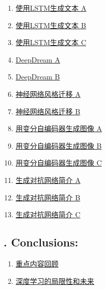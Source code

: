 \documentclass[11pt]{article}
\begin{document}
\begin{multicols}{2}
	\begin{enumerate}
		\item \href{https://mp.weixin.qq.com/s/PCwTsDdVVftTEWIDFxznFw}{使用LSTM生成文本 A}	%
		\item \href{https://mp.weixin.qq.com/s/6UILV9UGnSjaLiiz84laDA}{使用LSTM生成文本 B}	%
		\item \href{https://mp.weixin.qq.com/s/Cso1I8Njc4ifTsqwQ4UUCw}{使用LSTM生成文本 C}	%
		\item \href{https://mp.weixin.qq.com/s/riA-aYzBdUEE-K6VSOmt6Q}{DeepDream A}	%
		\item \href{https://mp.weixin.qq.com/s/cWqf3fHK3oQtgvj3CUb-FQ}{DeepDream B}	%
		\item \href{https://mp.weixin.qq.com/s/TxxqhPaGH4whobWxXkT5hg}{神经网络风格迁移 A}	%
		\item \href{https://mp.weixin.qq.com/s/MpBgzsyp5PrVCy3s_E5iqA}{神经网络风格迁移 B}	%
		\item \href{https://mp.weixin.qq.com/s/5VPZx2ncWuQWNS4istq9mw}{用变分自编码器生成图像 A}	%
		\item \href{https://mp.weixin.qq.com/s/F1L5FtnjwzKW65YvVVIAFw}{用变分自编码器生成图像 B}	%
		\item \href{https://mp.weixin.qq.com/s/7iLs7o0L8DBYAqYY6qswLA}{用变分自编码器生成图像 C}	%
		\item \href{https://mp.weixin.qq.com/s/tA38qtSJ4ZJ-kjOZugd5gg}{生成对抗网络简介 A}	%
		\item \href{https://mp.weixin.qq.com/s/c9J81SsufKd2FzgCgQ3Fog}{生成对抗网络简介 B}	%
		\item \href{https://mp.weixin.qq.com/s/zTSGydSPQ4CUvoc8JVVygg}{生成对抗网络简介 C}	%
	\end{enumerate}
\end{multicols}

\subsection*{\small {}. Conclusions:}

\vspace{-0.5cm}

\begin{multicols}{2}
	\begin{enumerate}
		\item \href{https://mp.weixin.qq.com/s/q0rSEn19fD8UkZIl_fNKXQ}{重点内容回顾}	%
		\item \href{https://mp.weixin.qq.com/s/_RGhISMwODlcLlQn-66EBA}{深度学习的局限性和未来}	%
	\end{enumerate}
\end{multicols}
\end{document}
